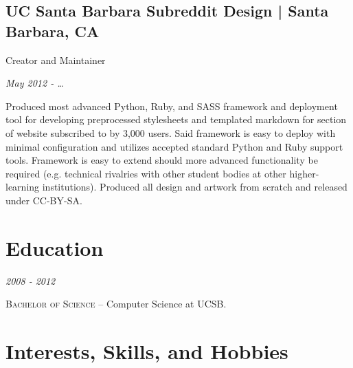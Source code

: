 \documentclass[10pt, letter]{article}
\newcommand{\years}[1]{\marginnote{#1}}
\renewcommand{\years}[1]{{\emph{#1}}}
\begin{document}
\begin{multicols}{2}
\subsection*{UC Santa Barbara Subreddit Design | {\footnotesize{Santa Barbara, CA}}}

Creator and Maintainer

\years{May 2012 - \ldots}

Produced most advanced Python, Ruby, and SASS framework and deployment tool for
developing preprocessed stylesheets and templated markdown for section of
website subscribed to by 3,000 users. Said framework is easy to deploy with
minimal configuration and utilizes accepted standard Python and
Ruby support tools. Framework is easy to extend should more advanced
functionality be required (e.g. technical rivalries with other student bodies
at other higher-learning institutions). Produced all design and artwork
from scratch and released under CC-BY-SA.

\section*{Education}

\years{2008 - 2012}

\textsc{Bachelor of Science} -- Computer Science at UCSB.

\section*{Interests, Skills, and Hobbies}


\end{multicols}
\end{document}
